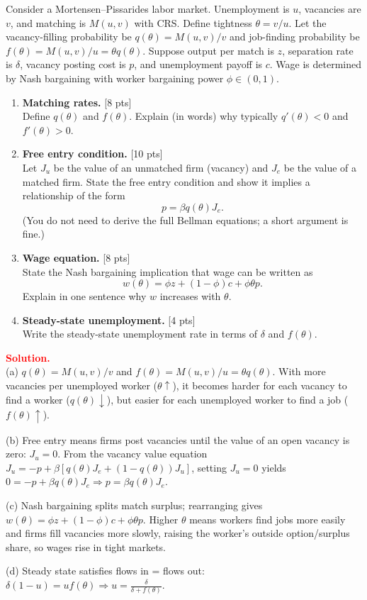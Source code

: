 \documentclass[12pt]{article}
\newenvironment{sol}{\par\smallskip\noindent \textcolor{red}{\textbf{Solution.}} \\ }{\par\medskip}
\newcommand{\pts}[1]{\hfill{\small[#1 pts]}}
\begin{document}
Consider a Mortensen--Pissarides labor market.
Unemployment is \(u\), vacancies are \(v\), and matching is \(M(u,v)\) with CRS.
Define tightness \(\theta=v/u\).
Let the vacancy-filling probability be \(q(\theta)=M(u,v)/v\) and job-finding probability be \(f(\theta)=M(u,v)/u=\theta q(\theta)\).
Suppose output per match is \(z\), separation rate is \(\delta\), vacancy posting cost is \(p\), and unemployment payoff is \(c\).
Wage is determined by Nash bargaining with worker bargaining power \(\phi\in(0,1)\).

\begin{enumerate}[label=(\alph*)]
\item \textbf{Matching rates.} \pts{8}\\
Define \(q(\theta)\) and \(f(\theta)\). Explain (in words) why typically \(q'(\theta)<0\) and \(f'(\theta)>0\).

\item \textbf{Free entry condition.} \pts{10}\\
Let \(J_u\) be the value of an unmatched firm (vacancy) and \(J_e\) be the value of a matched firm.
State the free entry condition and show it implies a relationship of the form
\[
p=\beta q(\theta)J_e.
\]
(You do not need to derive the full Bellman equations; a short argument is fine.)

\item \textbf{Wage equation.} \pts{8}\\
State the Nash bargaining implication that wage can be written as
\[
w(\theta)=\phi z + (1-\phi)c + \phi\theta p.
\]
Explain in one sentence why \(w\) increases with \(\theta\).

\item \textbf{Steady-state unemployment.} \pts{4}\\
Write the steady-state unemployment rate in terms of \(\delta\) and \(f(\theta)\).
\end{enumerate}

\begin{sol}
(a) \(q(\theta)=M(u,v)/v\) and \(f(\theta)=M(u,v)/u=\theta q(\theta)\).
With more vacancies per unemployed worker (\(\theta\uparrow\)), it becomes harder for each vacancy to find a worker
(\(q(\theta)\downarrow\)), but easier for each unemployed worker to find a job (\(f(\theta)\uparrow\)).

(b) Free entry means firms post vacancies until the value of an open vacancy is zero: \(J_u=0\).
From the vacancy value equation \(J_u=-p+\beta[q(\theta)J_e+(1-q(\theta))J_u]\),
setting \(J_u=0\) yields \(0=-p+\beta q(\theta)J_e\Rightarrow p=\beta q(\theta)J_e\).

(c) Nash bargaining splits match surplus; rearranging gives
\(w(\theta)=\phi z+(1-\phi)c+\phi\theta p\).
Higher \(\theta\) means workers find jobs more easily and firms fill vacancies more slowly, raising the worker’s outside option/surplus share,
so wages rise in tight markets.

(d) Steady state satisfies flows in = flows out:
\(\delta(1-u)=uf(\theta)\Rightarrow u=\frac{\delta}{\delta+f(\theta)}\).
\end{sol}
\end{document}
